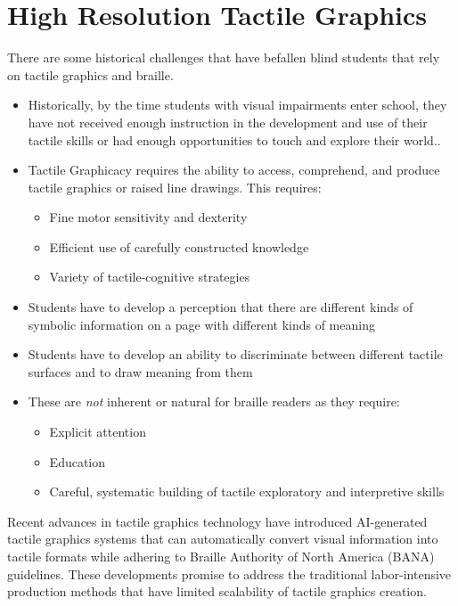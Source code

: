 \section{High Resolution Tactile Graphics}\label{tactile-graphics-high-resolution-complex-graphics}
There are some historical challenges that have befallen blind students that rely on tactile graphics and braille.
\begin{itemize}
 \item Historically, by the time students with visual impairments enter school, they have not received enough instruction in the development and use of their tactile skills or had enough opportunities to touch and explore their world.\cite{TactileSkillsDevelopment}.
 \item Tactile Graphicacy requires the ability to access, comprehend, and produce tactile graphics or raised line drawings. This requires:
   \begin{itemize}
     \item Fine motor sensitivity and dexterity
     \item Efficient use of carefully constructed knowledge
     \item Variety of tactile-cognitive strategies
   \end{itemize}
 \item Students have to develop a perception that there are different kinds of symbolic information on a page with different kinds of meaning
 \item Students have to develop an ability to discriminate between different tactile surfaces and to draw meaning from them
 \item These are \emph{not} inherent or natural for braille readers as they require:
   \begin{itemize}
     \item Explicit attention
     \item Education
     \item Careful, systematic building of tactile exploratory and interpretive skills
   \end{itemize}
\end{itemize}

Recent advances in tactile graphics technology have introduced AI-generated tactile graphics systems that can automatically convert visual information into tactile formats while adhering to Braille Authority of North America (BANA) guidelines. These developments promise to address the traditional labor-intensive production methods that have limited scalability of tactile graphics creation.

